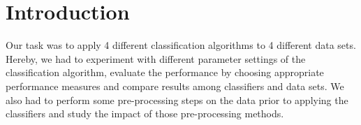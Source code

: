 \documentclass{sig-alternate-05-2015}
\begin{document}
%
\author{
%
%
\alignauthor
Lukas Stanek \\
       \\
       \\
       \\
       \email{----}
Thomas Appler \\
       \\
       \\
       \\
       \email{----}
\alignauthor
Marten Sigwart \\
       \\
       \\
       \\
}

\maketitle


\section{Introduction}
Our task was to apply 4 different classification algorithms to 4 different data sets. Hereby, we had to experiment with different parameter settings of the classification algorithm, evaluate the performance by choosing appropriate performance measures and compare results among classifiers and data sets. We also had to perform some pre-processing steps on the data prior to applying the classifiers and study the impact of those pre-processing methods.
\end{document}
